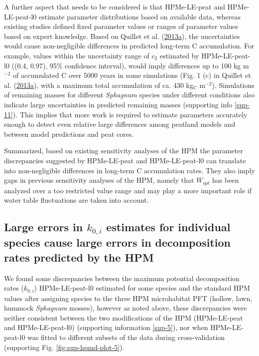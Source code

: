 \documentclass[
  12pt,
]{article}
\begin{document}
A further aspect that needs to be considered is that HPMe-LE-peat and HPMe-LE-peat-l0 estimate parameter distributions based on available data, whereas existing studies defined fixed parameter values or ranges of parameter values based on expert knowledge. Based on Quillet et al. (\protect\hyperlink{ref-Quillet.2013}{2013a}), the uncertainties would cause non-negligible differences in predicted long-term C accumulation. For example, values within the uncertainty range of \(c_2\) estimated by HPMe-LE-peat-l0 ((0.4, 0.97), 95\% confidence interval), would imply differences up to 100 kg m\(^{-2}\) of accumulated C over 5000 years in some simulations (Fig. 1 (c) in Quillet et al. (\protect\hyperlink{ref-Quillet.2013}{2013a}), with a maximum total accumulation of ca. 430 kg\(_\text{C}\) m\(^{-2}\)). Simulations of remaining masses for different \emph{Sphagnum} species under different conditions also indicate large uncertainties in predicted remaining masses (supporting info \ref{sup-11}). This implies that more work is required to estimate parameters accurately enough to detect even relative large differences among peatland models and between model predictions and peat cores.

Summarized, based on existing sensitivity analyses of the HPM the parameter discrepancies suggested by HPMe-LE-peat and HPMe-LE-peat-l0 can translate into non-negligible differences in long-term C accumulation rates. They also imply gaps in previous sensitivity analyses of the HPM, namely that \(W_{opt}\) has been analyzed over a too restricted value range and may play a more important role if water table fluctuations are taken into account.

\hypertarget{out-discussion-7}{%
\subsection{\texorpdfstring{Large errors in \(k_{0,i}\) estimates for individual species cause large errors in decomposition rates predicted by the HPM}{Large errors in k\_\{0,i\} estimates for individual species cause large errors in decomposition rates predicted by the HPM}}\label{out-discussion-7}}

We found some discrepancies between the maximum potential decomposition rates (\(k_{0,i}\)) HPMe-LE-peat-l0 estimated for some species and the standard HPM values after assigning species to the three HPM microhabitat PFT (hollow, lawn, hummock \emph{Sphagnum} mosses), however as noted above, these discrepancies were neither consistent between the two modifications of the HPM (HPMe-LE-peat and HPMe-LE-peat-l0) (supporting information \ref{sup-5}), nor when HPMe-LE-peat-l0 was fitted to different subsets of the data during cross-validation (supporting Fig. \ref{fig:sup-hpmd-plot-5}).
\end{document}
